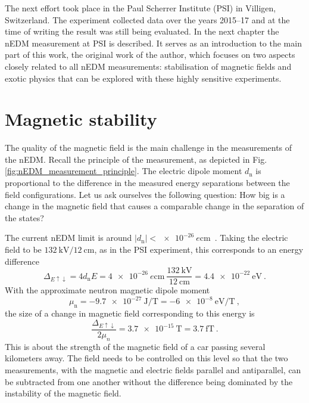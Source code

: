 The next effort took place in the Paul Scherrer Institute (PSI) in Villigen, Switzerland.
The experiment collected data over the years 2015--17 and at the time of writing the result was still being evaluated.
In the next chapter the nEDM measurement at PSI is described.
It serves as an introduction to the main part of this work, the original work of the author, which focuses on two aspects closely related to all nEDM measurements: stabilisation of magnetic fields and exotic physics that can be explored with these highly sensitive experiments.


\newpage
\section{Magnetic stability}
The quality of the magnetic field is the main challenge in the measurements of the nEDM\@. Recall the principle of the measurement, as depicted in Fig.\,\ref{fig:nEDM_measurement_principle}. The electric dipole moment $d_\text{n}$ is proportional to the difference in the measured energy separations between the field configurations. Let us ask ourselves the following question: How big is a change in the magnetic field that causes a comparable change in the separation of the states?

The current nEDM limit is around $|d_\text{n}| < \SI{e-26}{\elementarycharge\centi\meter}$~\cite{PhysRevLett.97.131801}. Taking the electric field to be $\SI{132}{\kilo\volt} / \SI{12}{\centi\meter}$, as in the PSI experiment, this corresponds to an energy difference
\begin{equation}
  \Delta_{E\uparrow\downarrow} = 4 d_\text{n} E = \SI{4e-26}{\elementarycharge\centi\meter} \ \frac{ \SI{132}{\kilo\volt} }{ \SI{12}{\centi\meter} } = \SI{4.4e-22}{\electronvolt} \ .
\end{equation}
With the approximate neutron magnetic dipole moment~\cite{Green1982}
\begin{equation}
  \mu_\text{n} = \SI{-9.7e-27}{\joule\per\tesla} = \SI{-6e-8}{\electronvolt\per\tesla} \ ,
\end{equation}
the size of a change in magnetic field corresponding to this energy is
\begin{equation}
  \frac{ \Delta_{E\uparrow\downarrow} }{2 \mu_n} = \SI{3.7e-15}{\tesla} = \SI{3.7}{\femto\tesla} \ .
\end{equation}
This is about the strength of the magnetic field of a car passing several kilometers away. The field needs to be controlled on this level so that the two measurements, with the magnetic and electric fields parallel and antiparallel, can be subtracted from one another without the difference being dominated by the instability of the magnetic field.

